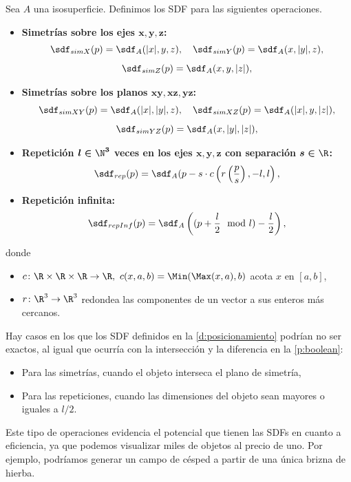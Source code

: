 \begin{definicion}\label{d:posicionamiento}
    Sea $A$ una isosuperficie. Definimos los SDF para las siguientes operaciones.
    \begin{itemize}
        \item \textbf{Simetrías sobre los ejes $\boldsymbol{x,y,z}$:}
        \begin{gather*}
            \sdf_{simX}(p) = \sdf_{A}(\vert x\vert, y, z),\quad \sdf_{simY}(p) = \sdf_{A}(x, \vert y\vert,  z),\\[5pt] \sdf_{simZ}(p) = \sdf_{A}(x,y,\vert z\vert),
        \end{gather*}
        \item \textbf{Simetrías sobre los planos $\boldsymbol{xy,xz,yz}$:}
        \begin{gather*}
            \sdf_{simXY}(p) = \sdf_{A}(\vert x\vert, \vert y\vert, z),\quad \sdf_{simXZ}(p) = \sdf_{A}(\vert x\vert, y,  \vert z\vert),\\[5pt]\sdf_{simYZ}(p) = \sdf_{A}(x,\vert y\vert ,\vert z\vert),
        \end{gather*}
        \item \textbf{Repetición $\boldsymbol{l\in \N^3}$ veces en los ejes $\boldsymbol{x,y,z}$ con separación $\boldsymbol{s\in\R}$:} 
        \begin{equation*}
            \sdf_{rep}(p) = \sdf_{A}(p - s\cdot c\left(r\left(\frac{p}{s}\right), -l, l\right),
        \end{equation*}
        \item \textbf{Repetición infinita:}
        \begin{equation*}
            \sdf_{repInf}(p) = \sdf_{A}\left((p+\frac{l}{2}\mod l )- \frac{l}{2}\right),
        \end{equation*}
    \end{itemize}
    donde
    \begin{itemize}
        \item $c\colon \R\times\R\times\R\to \R,\ c(x,a,b) = \Min(\Max(x, a), b)$ acota $x$ en $[a,b]$,
        \item $r\colon \R^3 \to \R^3$ redondea las componentes de un vector a sus enteros más cercanos.
    \end{itemize}
\end{definicion}

\begin{observacion}
    Hay casos en los que los SDF definidos en la \autoref{d:posicionamiento} podrían no ser exactos, al igual que ocurría con la intersección y la diferencia en la \autoref{p:boolean}:
    \begin{itemize}
        \item Para las simetrías, cuando el objeto interseca el plano de simetría,
        \item Para las repeticiones, cuando las dimensiones del objeto sean mayores o iguales a $l/2$.
    \end{itemize}
\end{observacion}

Este tipo de operaciones evidencia el potencial que tienen las SDFs en cuanto a eficiencia, ya que podemos visualizar miles de objetos al precio de uno. Por ejemplo, podríamos generar un campo de césped a partir de una única brizna de hierba.\newline

